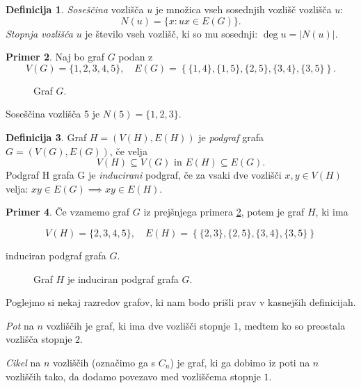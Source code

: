 \documentclass[12pt,a4paper]{amsart}
\theoremstyle{definition} %
\newtheorem{definicija}{Definicija}[section]
\newtheorem{primer}[definicija]{Primer}
\theoremstyle{plain} %
\newcommand{\graf}[1][G]{\ensuremath{#1 = (V(#1), E(#1))}}
\newcommand{\vozlisca}[1][G]{\ensuremath{V(#1)}}
\newcommand{\povezave}[1][G]{\ensuremath{E(#1)}}
\DeclareMathOperator {\stopnja} {deg}
\begin{document}
\begin{definicija}
	\emph{Soseščina} vozlišča $u$ je množica vseh sosednjih vozlišč vozlišča $u$:
	\[ N(u) = \{ x\colon ux \in \povezave \} .\]
	\emph{Stopnja vozlišča} $u$ je število vseh vozlišč, ki so mu sosednji: $\stopnja u = |N(u)|$.
\end{definicija}

\begin{primer}
    \label{primer:sosedi}
    Naj bo graf $G$ podan z \[\vozlisca = \{ 1,2,3,4,5 \}, \quad \povezave = \left\{ \{1,4\},\{1,5\},\{2,5\},\{3,4\},\{3,5\} \right\}.\]
    \begin{figure}[h]
        \caption{Graf $G$.}
    \end{figure}
    Soseščina vozlišča 5 je $N(5) = \{1,2,3\}$.
\end{primer}

\begin{definicija}
	Graf $\graf[H]$ je \emph{podgraf} grafa $\graf$, če velja 
	\[ \vozlisca[H] \subseteq \vozlisca \text{ in } \povezave[H] \subseteq \povezave. \]
	Podgraf H grafa G je \emph{inducirani} podgraf, če za vsaki dve vozlišči $x,y\in \vozlisca[H]$ velja: $xy \in \povezave \implies xy \in \povezave[H]$.
\end{definicija}

\begin{primer}
    Če vzamemo graf $G$ iz prejšnjega primera \ref{primer:sosedi}, potem je graf $H$, ki ima
    
    \[ \vozlisca[H] = \{2,3,4,5\},\quad \povezave[H] = \left\{ \{2,3\},\{2,5\},\{3,4\},\{3,5\} \right\} \]
    
    induciran podgraf grafa $G$.
    
    \begin{figure}[h]
        \caption{Graf $H$ je induciran podgraf grafa $G$.}
    \end{figure}
\end{primer}

Poglejmo si nekaj razredov grafov, ki nam bodo prišli prav v kasnejših definicijah. 

\emph{Pot} na $n$ vozliščih je graf, ki ima dve vozlišči stopnje $1$, medtem ko so preostala vozlišča stopnje $2$.

\emph{Cikel} na $n$ vozliščih (označimo ga s $C_n$) je graf, ki ga dobimo iz poti na $n$ vozliščih tako, da dodamo povezavo med vozliščema stopnje $1$.
\end{document}
